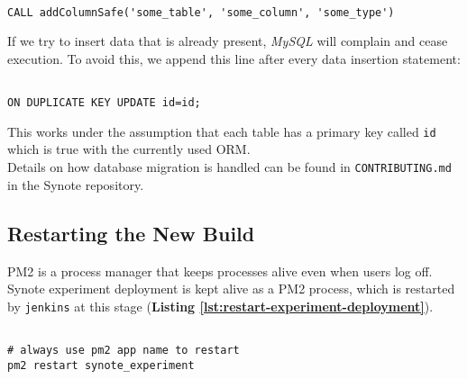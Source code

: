 \begin{listing}[H]
\begin{verbatim}

CALL addColumnSafe('some_table', 'some_column', 'some_type')

\end{verbatim}
\label{lst:calling-an-sql-procedure}
\end{listing}

If we try to insert data that is already present, \textit{MySQL} will complain and cease execution. To avoid this, we append this line after every data insertion statement:

\begin{listing}[H]
\begin{verbatim}

ON DUPLICATE KEY UPDATE id=id;

\end{verbatim}
\label{lst:avoiding-duplicate-data-insertion-errors}
\end{listing}

This works under the assumption that each table has a primary key called \texttt{id} which is true with the currently used ORM.
\\

Details on how database migration is handled can be found in \texttt{CONTRIBUTING.md} in the Synote repository.

\subsection{Restarting the New Build}
\label{subsec:restarting-the-new-build}

PM2 is a process manager that keeps processes alive even when users log off. Synote experiment deployment is kept alive as a PM2 process, which is restarted by \texttt{jenkins} at this stage (\textbf{Listing \ref{lst:restart-experiment-deployment}}).\\

\begin{listing}[H]
\begin{verbatim}

# always use pm2 app name to restart
pm2 restart synote_experiment

\end{verbatim}
\label{lst:restart-experiment-deployment}
\end{listing}


